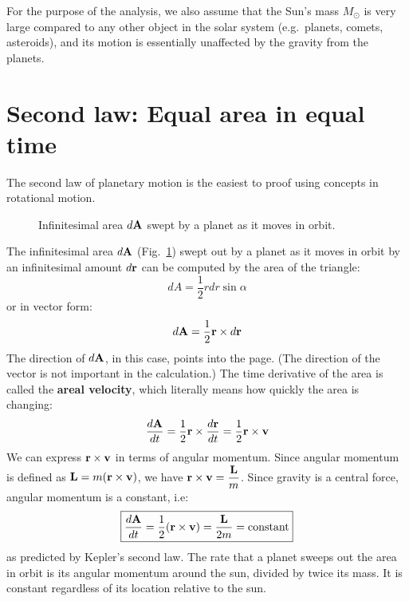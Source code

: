 \documentclass[11pt]{article}
\newcommand{\mb}[1]{
  \ensuremath\mathbf{#1}
}
\begin{document}
For the purpose of the analysis, we also assume that the Sun's mass $M_\odot$
is very large compared to any other object in the solar system (e.g.\ planets,
comets, asteroids), and its motion is essentially unaffected by the gravity
from the planets.


\section{Second law: Equal area in equal time}
The second law of planetary motion is the easiest to proof using concepts in
rotational motion.
\begin{figure}[ht]
  \begin{center}
    \end{center}
  \caption{Infinitesimal area $d\mb{A}$ swept by a planet as it moves in orbit.}
  \label{fig:dA}
\end{figure}
The infinitesimal area $d\mb{A}$ (Fig.~\ref{fig:dA}) swept out by a planet as
it moves in orbit by an infinitesimal amount $d\mb{r}$ can be computed by the
area of the triangle:
\begin{equation}
  dA=\frac{1}{2}rdr\sin\alpha
\end{equation}
or in vector form:
\begin{equation}
  d\mb{A}=\frac{1}{2}\mb{r}\times d\mb{r}
\end{equation}
The direction of $d\mb{A}$, in this case, points into the page. (The direction
of the vector is not important in the calculation.) The time derivative of the
area is called the \textbf{areal velocity}, which literally means how quickly
the area is changing:
\begin{equation}
  \frac{d\mb{A}}{dt}
  =\frac{1}{2}\mb{r}\times\frac{d\mb{r}}{dt}
  =\frac{1}{2}\mb{r}\times\mb{v}
\end{equation}
We can express $\mb{r}\times\mb{v}$ in terms of angular momentum. Since angular
momentum is defined as $\mb{L}=m(\mb{r}\times\mb{v})$, we have
$\displaystyle\mb{r}\times\mb{v}=\frac{\mb{L}}{m}$. Since gravity is a
central force, angular momentum is a constant, i.e:
\begin{equation}
  \boxed{\frac{d\mb{A}}{dt}
    =\frac{1}{2}(\mb{r}\times\mb{v})=\frac{\mb{L}}{2m}=
    \text{constant}
  }
  \label{constant}
\end{equation}
as predicted by Kepler's second law. The rate that a planet sweeps out the area
in orbit is its angular momentum around the sun, divided by twice its mass. It
is constant regardless of its location relative to the sun.
\end{document}
